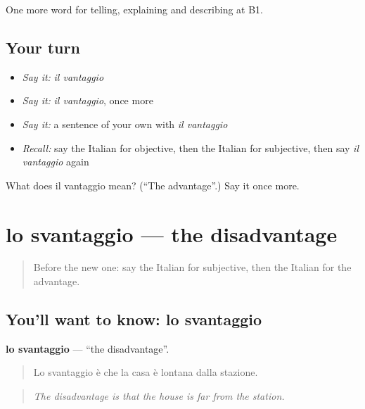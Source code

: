 \begin{grammarlens}[title={What you've built}]
One more word for telling, explaining and describing at B1.
\end{grammarlens}

\subsection*{Your turn}
\begin{itemize}
\raggedright
  \item \emph{Say it:} \emph{il vantaggio}
  \item \emph{Say it:} \emph{il vantaggio}, once more
  \item \emph{Say it:} a sentence of your own with \emph{il vantaggio}
  \item \emph{Recall:} say the Italian for objective, then the Italian for subjective, then say \emph{il vantaggio} again
\end{itemize}

\begin{tcolorbox}[breakable,colback=teal!4,colframe=teal!35!black,title={Before you move on}]
What does il vantaggio mean? (\textquotedblleft{}The advantage\textquotedblright{}.) Say it once more.
\end{tcolorbox}
\section[lo svantaggio]{lo svantaggio — the disadvantage}

\label{lesson:IT-C348-svantaggio}



\begin{quote}
Before the new one: say the Italian for subjective, then the Italian for the advantage.
\end{quote}

\subsection*{You'll want to know: lo svantaggio}
\textbf{lo svantaggio} — \textquotedblleft{}the disadvantage\textquotedblright{}.

\begin{quote}
Lo svantaggio è che la casa è lontana dalla stazione.
\end{quote}

\begin{quote}
\emph{The disadvantage is that the house is far from the station.}
\end{quote}

